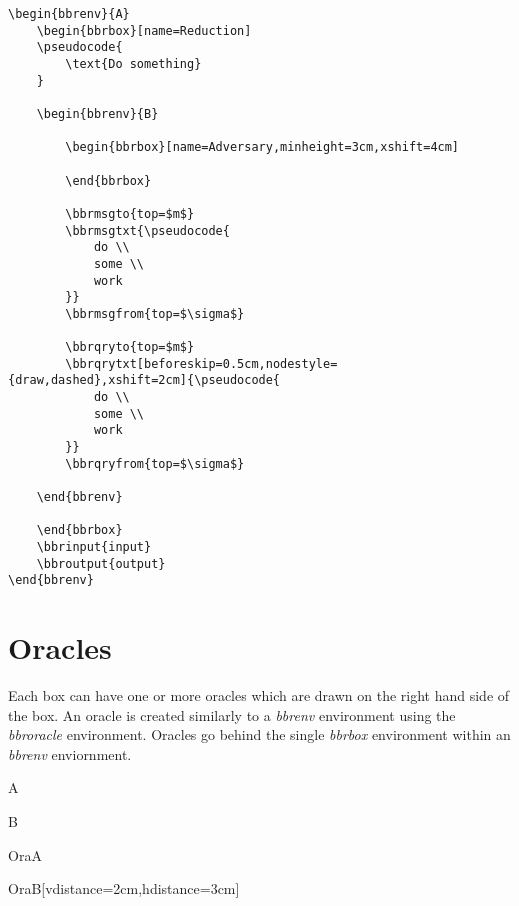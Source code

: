 \documentclass[a4paper]{report}
\begin{document}
\begin{lstlisting}
\begin{bbrenv}{A}
	\begin{bbrbox}[name=Reduction]
	\pseudocode{
		\text{Do something} 
	}

	\begin{bbrenv}{B}

		\begin{bbrbox}[name=Adversary,minheight=3cm,xshift=4cm]

		\end{bbrbox}
		
		\bbrmsgto{top=$m$}
		\bbrmsgtxt{\pseudocode{
			do \\
			some \\
			work
		}}
		\bbrmsgfrom{top=$\sigma$}

		\bbrqryto{top=$m$}
		\bbrqrytxt[beforeskip=0.5cm,nodestyle={draw,dashed},xshift=2cm]{\pseudocode{
			do \\
			some \\
			work
		}}
		\bbrqryfrom{top=$\sigma$}

	\end{bbrenv}

	\end{bbrbox}
	\bbrinput{input}
	\bbroutput{output}
\end{bbrenv}
\end{lstlisting}

\section{Oracles}
Each box can have one or more oracles which are drawn on the right hand side of the box. An oracle
is created similarly to a \emph{bbrenv} environment using the \emph{bbroracle} environment. Oracles
go behind the single \emph{bbrbox} environment within an \emph{bbrenv} enviornment.

\begin{bbrenv}{A}
	\begin{bbrbox}[name=Reduction]

	\begin{bbrenv}{B}
		\begin{bbrbox}[name=Adversary,minheight=3cm,xshift=4cm]
		\end{bbrbox}

	\end{bbrenv}

	\end{bbrbox}

	\begin{bbroracle}{OraA}
		\begin{bbrbox}[name=Oracle 1]
		\end{bbrbox}
	\end{bbroracle}

	\begin{bbroracle}{OraB}[vdistance=2cm,hdistance=3cm]
		\begin{bbrbox}[name=Oracle 2]
		\end{bbrbox}
	\end{bbroracle}
\end{bbrenv}
\end{document}
